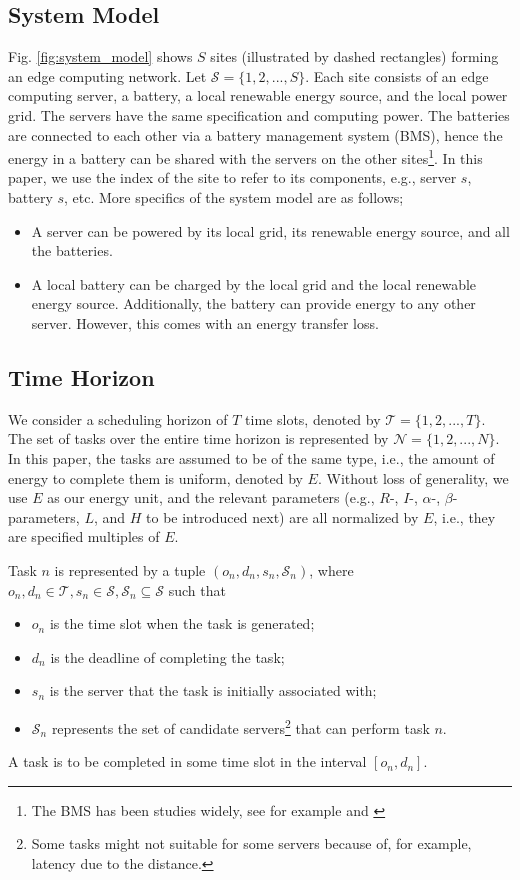 \documentclass[conference, 10pt, ﬁnal, letterpaper, twocolumn]{IEEEtran}
\begin{document}
\subsection{System Model}
Fig. \ref{fig:system_model} shows $S$ sites (illustrated by dashed rectangles) forming an edge computing network. Let $\mathcal{S} = \{1,2,...,S\}$. Each site consists of an edge computing server, a battery, a local renewable energy source, and the local power grid. The servers have the same specification and computing power. The batteries are connected to each other via a battery management system (BMS), hence the energy in a battery can be shared with the servers on the other sites\footnote{The BMS has been studies widely, see for example \cite{leithon2013online} and \cite{leithon2019task}}. In this paper, we use the index of the site to refer to its components, e.g., server $s$, battery $s$, etc. More specifics of the system model are as follows;
\begin{itemize}
    \item A server can be powered by its local grid, its renewable energy source, and all the batteries. 
    \item A local battery can be charged by the local grid and the local renewable energy source. Additionally, the battery can provide energy to any other server. However, this comes with an energy transfer loss.
\end{itemize}

\subsection{Time Horizon}
We consider a scheduling horizon of $T$ time slots, denoted by $\mathcal{T} = \{1,2,...,T\}$. The set of tasks over the entire time horizon is represented by $\mathcal{N} = \{1, 2, ..., N\}$. In this paper, the tasks are assumed to be of the same type, i.e., the amount of energy to complete them is uniform, denoted by $E$. Without loss of generality, we use $E$ as our energy unit, and the relevant parameters (e.g., $R$-, $I$-, $\alpha$-, $\beta$-parameters, $L$, and $H$ to be introduced next) are all normalized by $E$, i.e., they are specified multiples of $E$. 

Task $n$ is represented by a tuple $(o_n, d_n, s_n, \mathcal{S}_n)$, where $o_n, d_n \in \mathcal{T}, s_n \in \mathcal{S}, \mathcal{S}_n \subseteq \mathcal{S}$ such that
\begin{itemize}
    \item $o_n$ is the time slot when the task is generated;
    \item $d_n$ is the deadline of completing the task;
    \item $s_n$ is the server that the task is initially associated with;
    \item $\mathcal{S}_n$ represents the set of candidate servers\footnote{Some tasks might not suitable for some servers because of, for example, latency due to the distance.} that can perform task $n$.
\end{itemize}
A task is to be completed in some time slot in the interval $[o_n, d_n]$.
\end{document}
